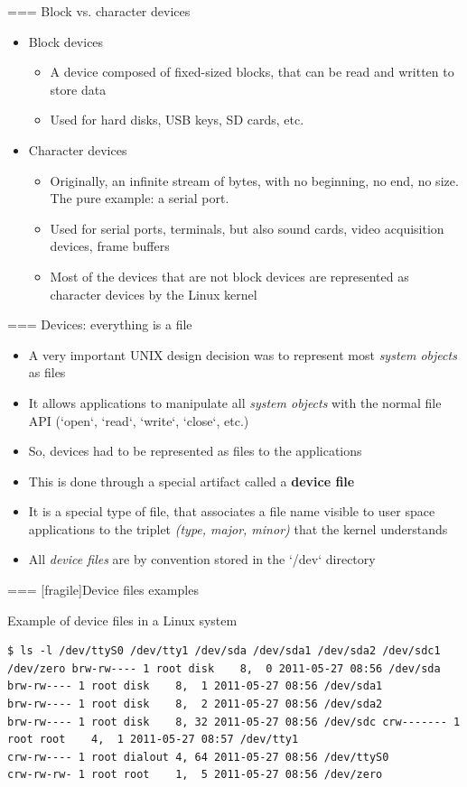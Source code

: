 === {Block vs. character devices}
  \begin{itemize}
  \item Block devices
    \begin{itemize}
    \item A device composed of fixed-sized blocks, that can be read
      and written to store data
    \item Used for hard disks, USB keys, SD cards, etc.
    \end{itemize}
  \item Character devices
    \begin{itemize}
    \item Originally, an infinite stream of bytes, with no beginning,
      no end, no size. The pure example: a serial port.
    \item Used for serial ports, terminals, but also sound cards,
      video acquisition devices, frame buffers
    \item Most of the devices that are not block devices are
      represented as character devices by the Linux kernel
    \end{itemize}
  \end{itemize}


=== {Devices: everything is a file}
  \begin{itemize}
  \item A very important UNIX design decision was to represent most
    {\em system objects} as files
  \item It allows applications to manipulate all {\em system objects} with
    the normal file API (`open`, `read`, `write`,
    `close`, etc.)
  \item So, devices had to be represented as files to the applications
  \item This is done through a special artifact called a {\bf device
      file}
  \item It is a special type of file, that associates a file name
    visible to user space applications to the triplet {\em (type,
      major, minor)} that the kernel understands
  \item All {\em device files} are by convention stored in the
    `/dev` directory
  \end{itemize}


=== [fragile]{Device files examples}

Example of device files in a Linux system

\small
\begin{verbatim}
$ ls -l /dev/ttyS0 /dev/tty1 /dev/sda /dev/sda1 /dev/sda2 /dev/sdc1 /dev/zero brw-rw---- 1 root disk    8,  0 2011-05-27 08:56 /dev/sda brw-rw---- 1 root disk    8,  1 2011-05-27 08:56 /dev/sda1
brw-rw---- 1 root disk    8,  2 2011-05-27 08:56 /dev/sda2
brw-rw---- 1 root disk    8, 32 2011-05-27 08:56 /dev/sdc crw------- 1 root root    4,  1 2011-05-27 08:57 /dev/tty1
crw-rw---- 1 root dialout 4, 64 2011-05-27 08:56 /dev/ttyS0
crw-rw-rw- 1 root root    1,  5 2011-05-27 08:56 /dev/zero
\end{verbatim}
\normalsize

